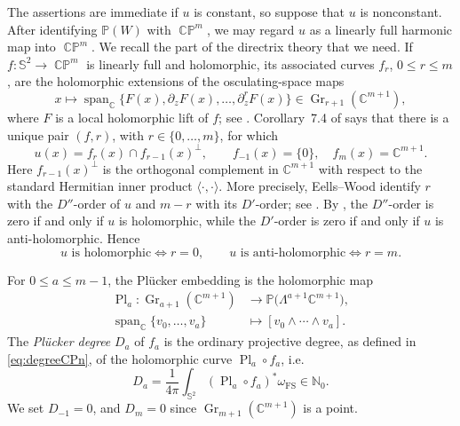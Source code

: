 \documentclass[11pt]{article}
\theoremstyle{plain}
\numberwithin{equation}{section}
\theoremstyle{definition}
\let\oldendproof\endproof
\renewenvironment{proof}[1][\proofname]{%
\oldproof[\upshape \bfseries #1]%
}{\oldendproof}
\def \C{\mathbb{C}}
\def \N{\mathbb{N}}
\def \mb{\mathbb}
\def \FS{\mathrm{FS}}
\DeclareMathOperator{\CP}{\mathbb{CP}}
\begin{document}
\begin{proof}[Proof of Theorem \ref{thm:harmonicSphereDichotomyCPn}]
The assertions are immediate if $u$ is constant, so suppose that $u$ is
nonconstant.  After identifying $\mb P(W)$ with $\CP^m$, we may regard $u$
as a linearly full harmonic map into $\CP^m$.  We recall the part of the
directrix theory that we need.  If $f\colon\mb S^2\to\CP^m$ is linearly
full and holomorphic, its associated curves $f_r$, $0\leq r\leq m$, are
the holomorphic extensions of the osculating-space maps
\[
    x\longmapsto
    \operatorname{span}_{\C}\{F(x),\partial_zF(x),\ldots,
    \partial_z^rF(x)\}\in \operatorname{Gr}_{r+1}(\C^{m+1}),
\]
where $F$ is a local holomorphic lift of $f$; see
\cite[Section~3A]{EellsWood1983}.  Corollary~7.4 of
\cite{EellsWood1983} says that there is a unique pair $(f,r)$, with
$r\in\{0,\ldots,m\}$, for which
\[
    u(x)=f_r(x)\cap f_{r-1}(x)^\perp,
    \qquad f_{-1}(x)=\{0\},\quad f_m(x)=\C^{m+1}.
\]
Here $f_{r-1}(x)^\perp$ is the orthogonal complement in $\C^{m+1}$ with
respect to the standard Hermitian inner product
$\langle\cdot,\cdot\rangle$.
More precisely, Eells--Wood identify $r$ with the $D''$-order of $u$ and
$m-r$ with its $D'$-order; see \cite[Theorem~6.9(i) and
Remark~6.10(i)]{EellsWood1983}.  By \cite[Definition~6.1]{EellsWood1983},
the $D''$-order is zero if and only if $u$ is holomorphic, while the
$D'$-order is zero if and only if $u$ is anti-holomorphic.  Hence
\[
    u\text{ is holomorphic}\iff r=0,
    \qquad
    u\text{ is anti-holomorphic}\iff r=m.
\]

For $0\leq a\leq m-1$, the Pl\"ucker embedding is the holomorphic map
\[
    \begin{aligned}
    \operatorname{Pl}_a\colon \operatorname{Gr}_{a+1}(\C^{m+1})
        &\longrightarrow \mb P\bigl(\Lambda^{a+1}\C^{m+1}\bigr),\\
    \operatorname{span}_{\C}\{v_0,\ldots,v_a\}
        &\longmapsto [v_0\wedge\cdots\wedge v_a].
    \end{aligned}
\]
The \emph{Pl\"ucker degree} $D_a$ of $f_a$ is the ordinary projective
degree, as defined in \eqref{eq:degreeCPn}, of the holomorphic curve
$\operatorname{Pl}_a\circ f_a$, i.e.\
\[
    D_a=\frac{1}{4\pi}\int_{\mb S^2}
    (\operatorname{Pl}_a\circ f_a)^*\omega_\FS\in\N_0.
\]
We set $D_{-1}=0$, and $D_m=0$ since
$\operatorname{Gr}_{m+1}(\C^{m+1})$ is a point.


\end{proof}
\end{document}
